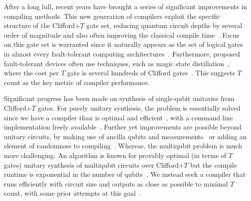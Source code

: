 \documentclass[notitlepage]{article}
\theoremstyle{definition}
\theoremstyle{problem}
\theoremstyle{lemma}
\begin{document}
		After a long lull, recent years have brought a series of significant improvements in compiling methods.  This new generation of compilers exploit the specific structure of the Clifford+$T$ gate set, reducing quantum circuit depths by several order of magnitude and also often improving the classical compile time~\cite{kliuchnikov13,selinger13,gosset14,RS14}.   Focus on this gate set is warranted since it naturally appears as the set of logical gates in almost every fault-tolerant computing architectures~\cite{ReviewPaper}.  Furthermore, proposed fault-tolerant devices often use techniques, such as magic state distillation~\cite{BraKit05},  where the cost per $T$ gate is several hundreds of Clifford gates~\cite{RHG01a,Fowler12,gorman17}.  This suggests $T$ count as the key metric of compiler performance.
		
		Significant progress has been made on synthesis of single-qubit unitaries from Clifford+$T$ gates.  For purely unitary synthesis, the problem is essentially solved since we have a compiler than is optimal and efficient~\cite{kliuchnikov13,RS14}, with a command line implementation freely available~\cite{gridsynth}.  Further yet improvements are possible beyond unitary circuits, by making use of ancilla qubits and measurements~\cite{paetznick14,bocharov15,bocharov15b} or adding an element of randomness to compiling~\cite{campbell17shorter,hastings2016mixing}.  Whereas, the multiqubit problem is much more challenging.  An algorithm is known for provably optimal (in terms of $T$ gates) unitary synthesis of multiqubit circuits over Clifford+$T$ but the compile runtime is exponential in the number of qubits~\cite{gosset14}.  We instead seek a compiler that runs efficiently with circuit size and outputs as close as possible to minimal $T$ count, with some prior attempts at this goal~\cite{amy2013meet}.  
		
\end{document}
